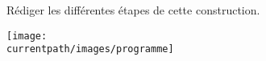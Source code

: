 \begin{exercice*} %
   Rédiger les différentes étapes de cette construction. 

   \texttt{[image: \\currentpath/images/programme]}
\end{exercice*}
